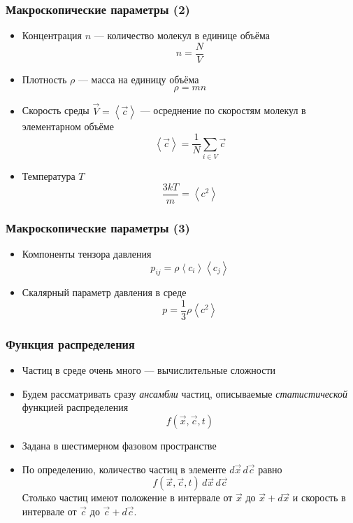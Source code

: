 \documentclass[onlymath]{beamer}
\newcommand\avg[1]{\left\langle{#1}\right\rangle}
\begin{document}
\begin{frame}
  \frametitle{Макроскопические параметры (2)}
  \begin{itemize}
  \item Концентрация $n$ — количество молекул в единице объёма
    \begin{equation*}
      n = \frac{N}{V}
    \end{equation*}
  \item Плотность $\rho$ — масса на единицу объёма
    \begin{equation*}
      \rho = m n
    \end{equation*}
  \item Скорость среды $\vec{V}=\avg{\vec{c}}$ — осреднение по скоростям молекул в
    элементарном объёме
    \begin{equation*}
      \avg{\vec{c}} = \frac{1}{N}\sum_{i \in V}{\vec{c}}
    \end{equation*}
  \item Температура $T$
    \begin{equation*}
      \frac{3kT}{m} = \avg{c^2}
    \end{equation*}
  \end{itemize}
\end{frame}

\begin{frame}
  \frametitle{Макроскопические параметры (3)}
  \begin{itemize}
  \item Компоненты тензора давления
    \begin{equation*}
      p_{ij} = \rho \avg{c_i} \avg{c_j}
    \end{equation*}
  \item Скалярный параметр давления в среде
    \begin{equation*}
      p = \frac{1}{3}\rho\avg{c^2}
    \end{equation*}
  \end{itemize}
\end{frame}

\begin{frame}
  \frametitle{Функция распределения}
  \begin{itemize}
  \item Частиц в среде очень много — вычислительные сложности
  \item Будем рассматривать сразу \emph{ансамбли} частиц, описываемые
    \emph{статистической} функцией распределения
    \begin{equation*}
      f(\vec{x}, \vec{c}, t)
    \end{equation*}
  \item Задана в шестимерном фазовом пространстве
  \item По определению, количество частиц в элементе $d\vec{x}\,
    d\vec{c}$ равно
    \begin{equation*}
      f(\vec{x}, \vec{c}, t) \,d\vec{x}\, d\vec{c}
    \end{equation*}
    Столько частиц имеют положение в интервале от $\vec{x}$ до
    $\vec{x}+d\vec{x}$ и скорость в интервале от $\vec{c}$ до
    $\vec{c}+d\vec{c}$.
  \end{itemize}
\end{frame}
\end{document}

